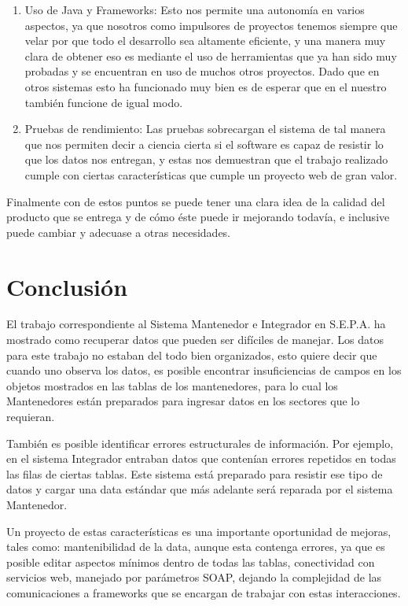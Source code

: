 \documentclass[a4paper,12pt,openany,oneside]{book}
\begin{document}
\begin{enumerate}
        \item Uso de Java y Frameworks: Esto nos permite una autonomía en varios aspectos, ya que nosotros como impulsores de proyectos tenemos siempre que velar por que todo el desarrollo sea altamente eficiente, y una manera muy clara de obtener eso es mediante el uso de herramientas que ya han sido muy probadas y se encuentran en uso de muchos otros proyectos. Dado que en otros sistemas esto ha funcionado muy bien es de esperar que en el nuestro también funcione de igual modo.
        \item Pruebas de rendimiento: Las pruebas sobrecargan el sistema de tal manera que nos permiten decir a ciencia cierta si el software es capaz de resistir lo que los datos nos entregan, y estas nos demuestran que el trabajo realizado cumple con ciertas características que cumple un proyecto web de gran valor.
\end{enumerate}

Finalmente con de estos puntos se puede tener una clara idea de la calidad del producto que se entrega y de cómo éste puede ir mejorando todavía, e inclusive puede cambiar y adecuase a otras necesidades.

\section{Conclusión}
El trabajo correspondiente al Sistema Mantenedor e Integrador en S.E.P.A. ha mostrado como recuperar datos que pueden ser difíciles de manejar. Los datos para este trabajo no estaban del todo bien organizados, esto quiere decir que cuando uno observa los datos, es posible encontrar insuficiencias de campos en los objetos mostrados en las tablas de los mantenedores, para lo cual los Mantenedores están preparados para ingresar datos en los sectores que lo requieran.

También es posible identificar errores estructurales de información. Por ejemplo, en el sistema Integrador entraban datos que contenían errores repetidos en todas las filas de ciertas tablas. Este sistema está preparado para resistir ese tipo de datos y cargar una data estándar que más adelante será reparada por el sistema Mantenedor.

Un proyecto de estas características es una importante oportunidad de mejoras, tales como: mantenibilidad de la data, aunque esta contenga errores, ya que es posible editar aspectos mínimos dentro de todas las tablas, conectividad con servicios web, manejado por parámetros SOAP, dejando la complejidad de las comunicaciones a frameworks que se encargan de trabajar con estas interacciones.
\end{document}
